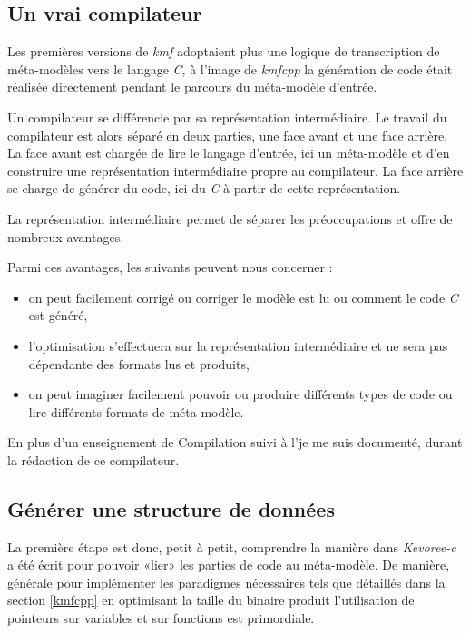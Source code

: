 \subsection{Un vrai compilateur}

Les premières versions de \emph{kmf} adoptaient plus une logique de transcription de méta-modèles vers le langage \emph{C}, à l'image de \emph{kmfcpp} la génération de code était réalisée directement pendant le parcours du méta-modèle d'entrée.

Un compilateur se différencie par sa représentation intermédiaire. Le travail du compilateur est alors séparé en deux parties, une face avant et une face arrière. La face avant est chargée de lire le langage d'entrée, ici un méta-modèle et d'en construire une représentation intermédiaire propre au compilateur. La face arrière se charge de générer du code, ici du \emph{C} à partir de cette représentation.

La représentation intermédiaire permet de séparer les préoccupations et offre de nombreux avantages.

Parmi ces avantages, les suivants peuvent nous concerner :
\begin{itemize}
\item on peut facilement corrigé ou corriger le modèle est lu ou comment le code \emph{C} est généré,
\item l'optimisation s'effectuera sur la représentation intermédiaire et ne sera pas dépendante des formats lus et produits,
\item on peut imaginer facilement pouvoir ou produire différents types de code ou lire différents formats de méta-modèle.
\end{itemize}

En plus d'un enseignement de Compilation suivi à l'\univname je me suis documenté\cite{freeman2004head}, \cite{Appel2003MCI599718} durant la rédaction de ce compilateur.

\subsection{Générer une structure de données}

La première étape est donc, petit à petit, comprendre la manière dans \emph{Kevoree-c} a été écrit pour pouvoir «lier» les parties de code au méta-modèle. De manière, générale pour implémenter les paradigmes nécessaires tels que détaillés dans la section \ref{kmfcpp} en optimisant la taille du binaire produit l'utilisation de pointeurs sur variables et sur fonctions est primordiale.

